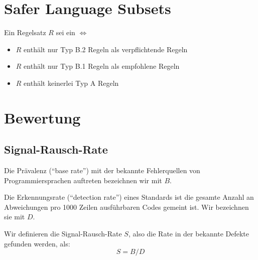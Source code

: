 \documentclass[a4paper,UKenglish,cleveref, autoref]{templates/lipics-v2019}
\begin{document}
    \section{Safer Language Subsets}
    \label{sec:safer-language-subsets}
    \begin{definition}
        Ein Regelsatz $R$ sei ein \sls $\iff$
        \begin{itemize}
            \item $R$ enthält nur Typ B.2 Regeln als verpflichtende Regeln
            \item $R$ enthält nur Typ B.1 Regeln als empfohlene Regeln
            \item $R$ enthält keinerlei Typ A Regeln
        \end{itemize}
        
    \end{definition}
    
    \section{Bewertung}
    \label{sec:bewertung}

    \subsection{Signal-Rausch-Rate}
    \label{subsec:signal-rausch-rate}

    \begin{definition}
        Die Prävalenz (\enquote{base rate}) mit der bekannte Fehlerquellen von Programmiersprachen auftreten bezeichnen wir mit $B$.
    \end{definition}

    \begin{definition}
        Die Erkennungsrate (\enquote{detection rate}) eines Standards ist die gesamte Anzahl an Abweichungen pro 1000 Zeilen
        ausführbaren Codes gemeint ist.
        Wir bezeichnen sie mit $D$.
    \end{definition}
    
    \begin{definition}
        Wir definieren die Signal-Rausch-Rate $S$, also die Rate in der bekannte Defekte gefunden werden, als:
        \begin{equation*}
            S=B/D
        \end{equation*}
    \end{definition}
\end{document}

